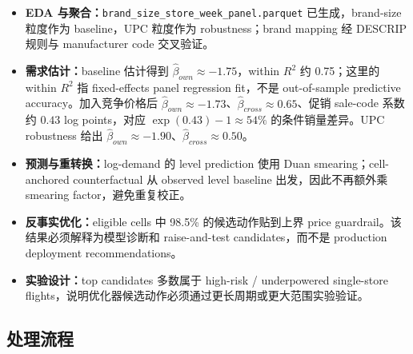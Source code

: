 \documentclass[UTF8,11pt,a4paper,fontset=none]{ctexart}
\begin{document}
\begin{itemize}
  \item \textbf{EDA 与聚合：}\texttt{brand\_size\_store\_week\_panel.parquet} 已生成，brand-size 粒度作为 baseline，UPC 粒度作为 robustness；brand mapping 经 DESCRIP 规则与 manufacturer code 交叉验证。
  \item \textbf{需求估计：}baseline 估计得到 $\widehat{\beta}_{own}\approx -1.75$，within $R^2$ 约 0.75；这里的 within $R^2$ 指 fixed-effects panel regression fit，不是 out-of-sample predictive accuracy。加入竞争价格后 $\widehat{\beta}_{own}\approx -1.73$、$\widehat{\beta}_{cross}\approx 0.65$、促销 sale-code 系数约 $0.43$ log points，对应 $\exp(0.43)-1\approx54\%$ 的条件销量差异。UPC robustness 给出 $\widehat{\beta}_{own}\approx -1.90$、$\widehat{\beta}_{cross}\approx 0.50$。
  \item \textbf{预测与重转换：}log-demand 的 level prediction 使用 Duan smearing；cell-anchored counterfactual 从 observed level baseline 出发，因此不再额外乘 smearing factor，避免重复校正。
  \item \textbf{反事实优化：}eligible cells 中 98.5\% 的候选动作贴到上界 price guardrail。该结果必须解释为模型诊断和 raise-and-test candidates，而不是 production deployment recommendations。
  \item \textbf{实验设计：}top candidates 多数属于 high-risk / underpowered single-store flights，说明优化器候选动作必须通过更长周期或更大范围实验验证。
\end{itemize}

\subsection{处理流程}
\end{document}
